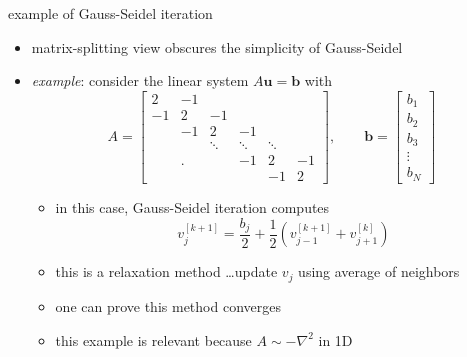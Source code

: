 \documentclass[10pt,
               svgnames,
               hyperref={colorlinks,citecolor=DeepPink4,linkcolor=FireBrick,urlcolor=Maroon},
               usepdftitle=false]{beamer}
\newcommand{\bb}{\mathbf{b}}
\newcommand{\bu}{\mathbf{u}}
\newcommand{\grad}{\nabla}
\begin{document}
\begin{frame}{example of Gauss-Seidel iteration}
\begin{itemize}
\item matrix-splitting view obscures the simplicity of Gauss-Seidel
\item \emph{example}: consider the linear system $A\bu=\bb$ with
    $$A = \begin{bmatrix} 2 & -1 & & & & \\ -1 & 2 & -1 & & & \\ & -1 & 2 & -1 & & \\ & & \ddots & \ddots & \ddots & \\ & \Big. & & -1 & 2 & -1 \\ & & & & -1 & 2 \end{bmatrix}, \qquad \bb = \begin{bmatrix} b_1 \\ b_2 \\ b_3 \\ \vdots \\ b_N \end{bmatrix}$$

    \begin{itemize}
    \item[$\circ$] in this case, Gauss-Seidel iteration computes
    $$v_j^{[k+1]} = \frac{b_j}{2} + \frac{1}{2} \left(v_{j-1}^{[k+1]} + v_{j+1}^{[k]}\right)$$
    \item[$\circ$] this is a \alert{relaxation} method \dots update $v_j$ using average of neighbors
    \item[$\circ$] one can prove this method converges
    \item[$\circ$] this example is relevant because $A \sim -\grad^2$ in 1D
    \end{itemize}
\end{itemize}
\end{frame}
\end{document}
